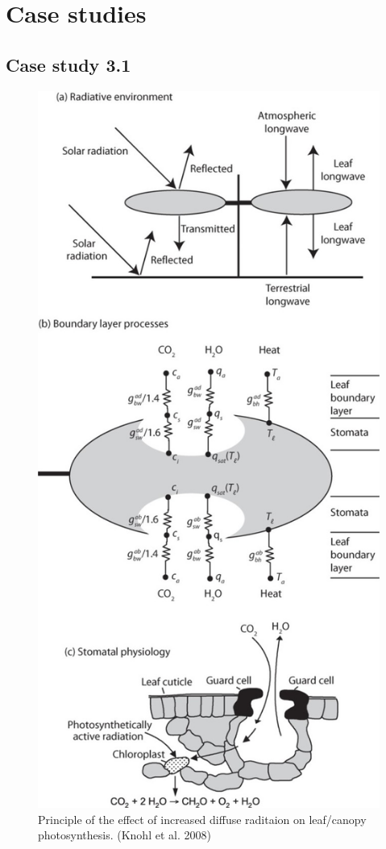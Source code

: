 \documentclass[
  oneside]{book}
\begin{document}
\hypertarget{case-studies-1}{%
\section{Case studies}\label{case-studies-1}}

\hypertarget{case-study-3.1}{%
\subsection{Case study 3.1}\label{case-study-3.1}}

\begin{figure}

{\centering \includegraphics[width=0.8\linewidth]{figures/chap3/f331_leaf_E_balance} 

}

\caption{Principle of the effect of increased diffuse raditaion on leaf/canopy photosynthesis. (Knohl et al. 2008)}\label{fig:f332}
\end{figure}
\end{document}

